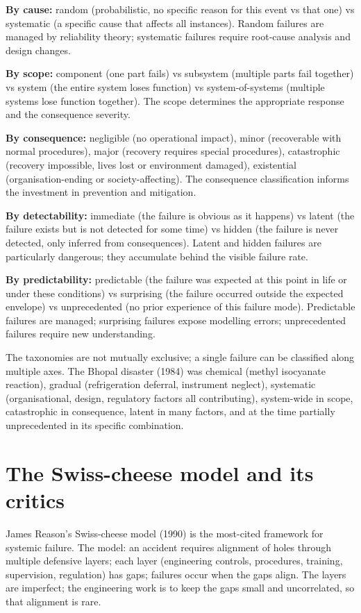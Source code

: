 \textbf{By cause:} random (probabilistic, no specific reason for this event vs that one) vs systematic (a specific cause that affects all instances). Random failures are managed by reliability theory; systematic failures require root-cause analysis and design changes.

\textbf{By scope:} component (one part fails) vs subsystem (multiple parts fail together) vs system (the entire system loses function) vs system-of-systems (multiple systems lose function together). The scope determines the appropriate response and the consequence severity.

\textbf{By consequence:} negligible (no operational impact), minor (recoverable with normal procedures), major (recovery requires special procedures), catastrophic (recovery impossible, lives lost or environment damaged), existential (organisation-ending or society-affecting). The consequence classification informs the investment in prevention and mitigation.

\textbf{By detectability:} immediate (the failure is obvious as it happens) vs latent (the failure exists but is not detected for some time) vs hidden (the failure is never detected, only inferred from consequences). Latent and hidden failures are particularly dangerous; they accumulate behind the visible failure rate.

\textbf{By predictability:} predictable (the failure was expected at this point in life or under these conditions) vs surprising (the failure occurred outside the expected envelope) vs unprecedented (no prior experience of this failure mode). Predictable failures are managed; surprising failures expose modelling errors; unprecedented failures require new understanding.

The taxonomies are not mutually exclusive; a single failure can be classified along multiple axes. The Bhopal disaster (1984) was chemical (methyl isocyanate reaction), gradual (refrigeration deferral, instrument neglect), systematic (organisational, design, regulatory factors all contributing), system-wide in scope, catastrophic in consequence, latent in many factors, and at the time partially unprecedented in its specific combination.

\section{The Swiss-cheese model and its critics}

James Reason's Swiss-cheese model (1990) is the most-cited framework for systemic failure. The model: an accident requires alignment of holes through multiple defensive layers; each layer (engineering controls, procedures, training, supervision, regulation) has gaps; failures occur when the gaps align. The layers are imperfect; the engineering work is to keep the gaps small and uncorrelated, so that alignment is rare.

